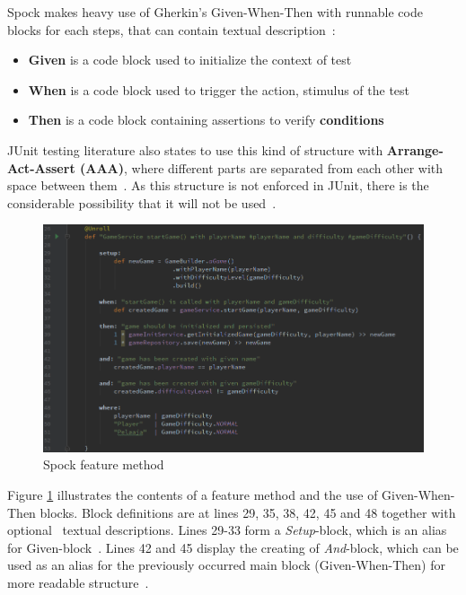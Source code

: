     Spock makes heavy use of Gherkin's Given-When-Then with runnable code blocks for each steps, that can contain textual
    description~\cite{kapelonis2016java}:
    \begin{itemize}
    \item \textbf{Given} is a code block used to initialize the context of test
    \item \textbf{When} is a code block used to trigger the action, stimulus of the test
    \item \textbf{Then} is a code block containing assertions to verify \textbf{conditions}
    \end{itemize}
    JUnit testing literature also states to use this kind of structure with \textbf{Arrange-Act-Assert (AAA)},
    where different parts are separated from each other with space between them~\cite{langr2015pragmatic}.
    As this structure is not enforced in JUnit, there is the considerable possibility that it will not be used~\cite{kapelonis2016java}.
    \begin{figure}[ht]
      \begin{center}
        \includegraphics[width=13.7cm]{images/spock-example.png}
        \caption{Spock feature method}
        \label{fig:spock-example}
      \end{center}
    \end{figure}

    Figure \ref{fig:spock-example} illustrates the contents of a feature method and the use of Given-When-Then blocks.
    Block definitions are at lines 29, 35, 38, 42, 45 and 48 together
    with optional~\cite{spock} textual descriptions.
    Lines 29-33 form a \textit{Setup}-block, which is an alias for Given-block~\cite{spock}.
    Lines 42 and 45 display the creating of \textit{And}-block, which can be used as
    an alias for the previously occurred main block (Given-When-Then) for more readable structure~\cite{kapelonis2016java}.

